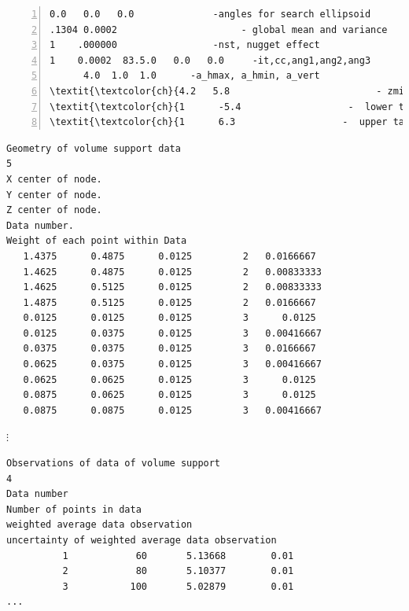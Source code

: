 \documentclass[12t]{article}
\begin{document}
\begin{table}
\begin{Verbatim}[fontfamily=tt,numbers=left,commandchars=\\\{\}]
 0.0   0.0   0.0              -angles for search ellipsoid
.1304 0.0002                      - global mean and variance
1    .000000                 -nst, nugget effect
1    0.0002  83.5.0   0.0   0.0     -it,cc,ang1,ang2,ang3
      4.0  1.0  1.0      -a_hmax, a_hmin, a_vert
\textit{\textcolor{ch}{4.2   5.8                          - zmin,zmax (tail extrapolation for target histogram)}}
\textit{\textcolor{ch}{1      -5.4                   -  lower tail option, parameter}}
\textit{\textcolor{ch}{1      6.3                   -  upper tail option, parameter}}
\end{Verbatim}
\caption{Input parameter file for \visimprog.}
\label{tab:par}
\end{table}


\clearpage
\begin{table}
\begin{Verbatim}
Geometry of volume support data
5
X center of node.
Y center of node.
Z center of node.
Data number.
Weight of each point within Data
   1.4375      0.4875      0.0125         2   0.0166667
   1.4625      0.4875      0.0125         2   0.00833333
   1.4625      0.5125      0.0125         2   0.00833333
   1.4875      0.5125      0.0125         2   0.0166667
   0.0125      0.0125      0.0125         3      0.0125
   0.0125      0.0375      0.0125         3   0.00416667
   0.0375      0.0375      0.0125         3   0.0166667
   0.0625      0.0375      0.0125         3   0.00416667
   0.0625      0.0625      0.0125         3      0.0125
   0.0875      0.0625      0.0125         3      0.0125
   0.0875      0.0875      0.0125         3   0.00416667
\end{Verbatim}
$\vdots$
\caption{\visimprog~ Geometry of data of volume support}
\label{tab:volgeom}
\end{table}


\clearpage
\begin{table}
\begin{Verbatim}
Observations of data of volume support
4
Data number
Number of points in data
weighted average data observation
uncertainty of weighted average data observation
          1            60       5.13668        0.01
          2            80       5.10377        0.01
          3           100       5.02879        0.01
...
\end{Verbatim}
\caption{\visimprog~ Measurements of data of volume support}
\label{tab:volobs}
\end{table}

%
\end{document}
